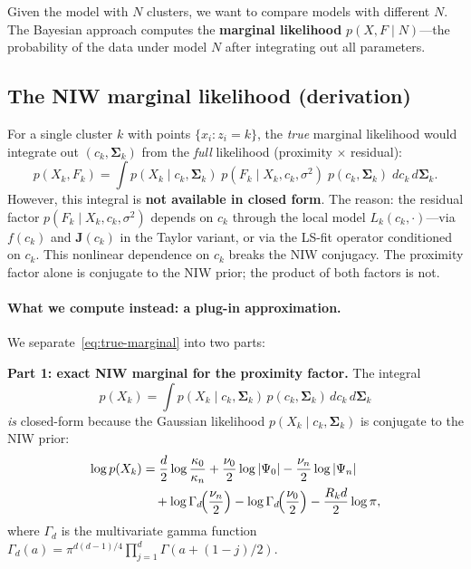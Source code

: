 \documentclass[11pt]{article}
\theoremstyle{definition}
\theoremstyle{plain}
\theoremstyle{remark}
\newcommand{\Sv}{\boldsymbol{\Sigma}}
\newcommand{\Jv}{\boldsymbol{J}}
\begin{document}
Given the model with $N$ clusters, we want to compare models with different $N$. The Bayesian approach computes the \textbf{marginal likelihood} $p(X,F\mid N)$---the probability of the data under model $N$ after integrating out all parameters.

\subsection{The NIW marginal likelihood (derivation)}

For a single cluster $k$ with points $\{x_i:z_i=k\}$, the \emph{true} marginal likelihood would integrate out $(c_k,\Sv_k)$ from the \emph{full} likelihood (proximity $\times$ residual):
\begin{equation}
  p(X_k,F_k) = \int p(X_k\mid c_k,\Sv_k)\;p(F_k\mid X_k,c_k,\sigma^2)\;p(c_k,\Sv_k)\;dc_k\,d\Sv_k.
  \label{eq:true-marginal}
\end{equation}
However, this integral is \textbf{not available in closed form}. The reason: the residual factor $p(F_k\mid X_k,c_k,\sigma^2)$ depends on $c_k$ through the local model $L_k(c_k,\cdot)$---via $f(c_k)$ and $\Jv(c_k)$ in the Taylor variant, or via the LS-fit operator conditioned on $c_k$. This nonlinear dependence on $c_k$ breaks the NIW conjugacy. The proximity factor alone is conjugate to the NIW prior; the product of both factors is not.

\paragraph{What we compute instead: a plug-in approximation.} We separate~\eqref{eq:true-marginal} into two parts:

\textbf{Part 1: exact NIW marginal for the proximity factor.} The integral
\begin{equation}
  p(X_k) = \int p(X_k\mid c_k,\Sv_k)\,p(c_k,\Sv_k)\,dc_k\,d\Sv_k
\end{equation}
\emph{is} closed-form because the Gaussian likelihood $p(X_k\mid c_k,\Sv_k)$ is conjugate to the NIW prior:
\begin{align}
  \log p(X_k) &= \frac{d}{2}\log\frac{\kappa_0}{\kappa_n} + \frac{\nu_0}{2}\log|\Psi_0| - \frac{\nu_n}{2}\log|\Psi_n| \notag \\
  &\quad + \log\Gamma_d\!\Bigl(\frac{\nu_n}{2}\Bigr) - \log\Gamma_d\!\Bigl(\frac{\nu_0}{2}\Bigr) - \frac{R_k d}{2}\log\pi,
\end{align}
where $\Gamma_d$ is the multivariate gamma function $\Gamma_d(a)=\pi^{d(d-1)/4}\prod_{j=1}^d\Gamma(a+(1-j)/2)$.
\end{document}

